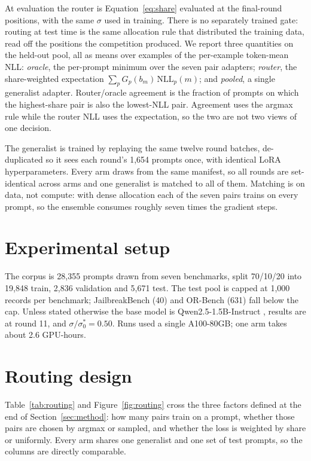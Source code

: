 \documentclass{article}
\begin{document}
At evaluation the router is Equation~\ref{eq:share} evaluated at the final-round positions, with the
same $\sigma$ used in training. There is no separately trained gate: routing at test time is the same
allocation rule that distributed the training data, read off the positions the competition produced. We report three quantities on
the held-out pool, all as means over examples of the per-example token-mean NLL:
\emph{oracle}, the per-prompt minimum over the seven pair adapters;
\emph{router}, the share-weighted expectation $\sum_p G_p(b_m)\,\mathrm{NLL}_p(m)$;
and \emph{pooled}, a single generalist adapter. Router/oracle agreement is the fraction of prompts on
which the highest-share pair is also the lowest-NLL pair. Agreement uses the argmax rule while the
router NLL uses the expectation, so the two are not two views of one decision.

The generalist is trained by replaying the same twelve round batches, de-duplicated so it sees each
round's 1{,}654 prompts once, with identical LoRA hyperparameters. Every arm draws from the same
manifest, so all rounds are set-identical across arms and one generalist is matched to all of them.
Matching is on data, not compute: with dense allocation each of the seven pairs trains on every
prompt, so the ensemble consumes roughly seven times the gradient steps.

\section{Experimental setup}
The corpus is 28{,}355 prompts drawn from seven benchmarks, split 70/10/20 into 19{,}848 train,
2{,}836 validation and 5{,}671 test. The test pool is capped at 1{,}000 records per benchmark;
JailbreakBench (40) and OR-Bench (631) fall below the cap. Unless stated otherwise the base model is
Qwen2.5-1.5B-Instruct \citep{qwen2024qwen25}, results are at round 11, and $\sigma/\sigma_0^* = 0.50$.
Runs used a single A100-80GB; one arm takes about 2.6 GPU-hours.

\section{Routing design}
\label{sec:routing}
Table~\ref{tab:routing} and Figure~\ref{fig:routing} cross the three factors defined at the end of
Section~\ref{sec:method}: how many pairs train on a prompt, whether those pairs are chosen by argmax
or sampled, and whether the loss is weighted by share or uniformly. Every arm shares one generalist
and one set of test prompts, so the columns are directly comparable.
\end{document}
